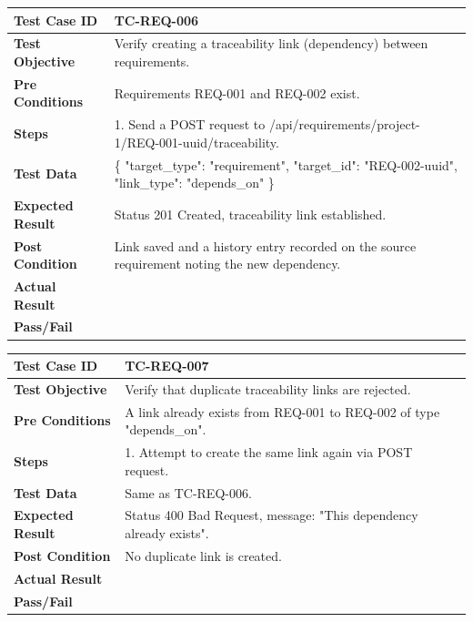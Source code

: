 \begin{longtable}{|p{}|p{}|}
\hline
\textbf{Test Case ID} & TC-REQ-006 \\ \hline
\textbf{Test Objective} & Verify creating a traceability link (dependency) between requirements. \\ \hline
\textbf{Pre Conditions} & Requirements REQ-001 and REQ-002 exist. \\ \hline
\textbf{Steps} & 
1. Send a POST request to /api/requirements/project-1/REQ-001-uuid/traceability. \\ \hline
\textbf{Test Data} & \{ "target\_type": "requirement", "target\_id": "REQ-002-uuid", "link\_type": "depends\_on" \} \\ \hline
\textbf{Expected Result} & Status 201 Created, traceability link established. \\ \hline
\textbf{Post Condition} & Link saved and a history entry recorded on the source requirement noting the new dependency. \\ \hline
\textbf{Actual Result} &  \\ \hline
\textbf{Pass/Fail} &  \\ \hline
\end{longtable}

\begin{longtable}{|p{}|p{}|}
\hline
\textbf{Test Case ID} & TC-REQ-007 \\ \hline
\textbf{Test Objective} & Verify that duplicate traceability links are rejected. \\ \hline
\textbf{Pre Conditions} & A link already exists from REQ-001 to REQ-002 of type "depends\_on". \\ \hline
\textbf{Steps} & 
1. Attempt to create the same link again via POST request. \\ \hline
\textbf{Test Data} & Same as TC-REQ-006. \\ \hline
\textbf{Expected Result} & Status 400 Bad Request, message: "This dependency already exists". \\ \hline
\textbf{Post Condition} & No duplicate link is created. \\ \hline
\textbf{Actual Result} &  \\ \hline
\textbf{Pass/Fail} &  \\ \hline
\end{longtable}


